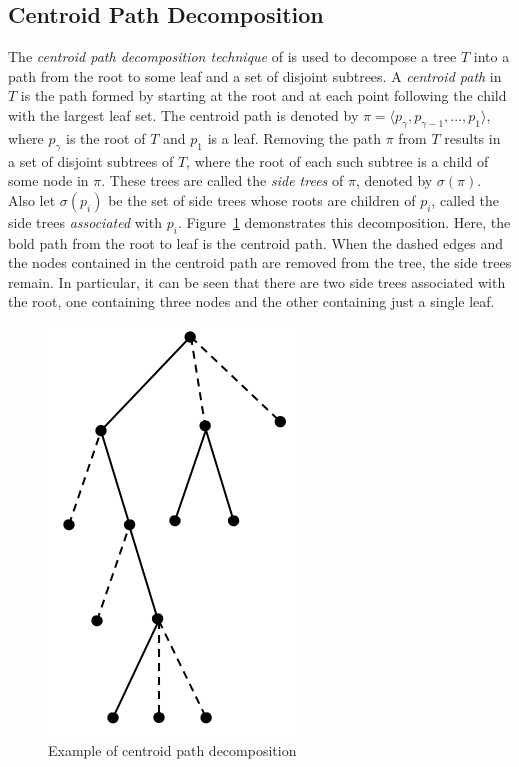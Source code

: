 \documentclass{article}
\begin{document}
    \subsection{Centroid Path Decomposition}

    The \textit{centroid path decomposition technique} of \cite{cole2000n} is used to decompose a tree $T$ into a path from the root to some leaf and a set of disjoint subtrees. A \textit{centroid path} in $T$ is the path formed by starting at the root and at each point following the child with the largest leaf set. The centroid path is denoted by $\pi = \langle p_{\gamma}, p_{\gamma - 1}, ..., p_1 \rangle$, where $p_{\gamma}$ is the root of $T$ and $p_1$ is a leaf. Removing the path $\pi$ from $T$ results in a set of disjoint subtrees of $T$, where the root of each such subtree is a child of some node in $\pi$. These trees are called the \textit{side trees} of $\pi$, denoted by $\sigma(\pi)$. Also let $\sigma(p_i)$ be the set of side trees whose roots are children of $p_i$, called the side trees \textit{associated} with $p_i$. Figure~\ref{fig:centroid} demonstrates this decomposition. Here, the bold path from the root to leaf is the centroid path. When the dashed edges and the nodes contained in the centroid path are removed from the tree, the side trees remain. In particular, it can be seen that there are two side trees associated with the root, one containing three nodes and the other containing just a single leaf.

    \begin{figure}[h]
        \includegraphics[scale=0.5]{centroid}
        \centering
        \caption{Example of centroid path decomposition}
        \label{fig:centroid}
    \end{figure}
\end{document}
